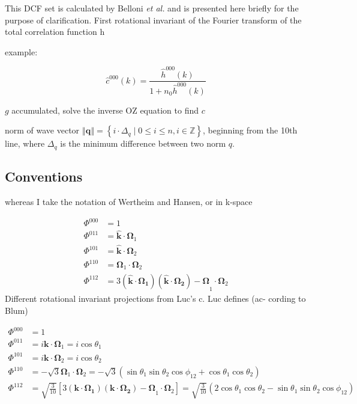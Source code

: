 This DCF set is calculated by Belloni \textit{et al.} \citep{Luc_2012}
and is presented here briefly for the purpose of clarification. First
rotational invariant of the Fourier transform of the total correlation
function h

example:

\[
\hat{c}^{000}(k)=\frac{\hat{h}^{000}(k)}{1+n_{0}\hat{h}^{000}(k)}
\]


$g$ accumulated, solve the inverse OZ equation to find $c$

norm of wave vector $\left\Vert \mathbf{q}\right\Vert =\left\{ i\cdot\Delta_{q}\mid0\leq i\leq n,i\in\mathbb{Z}\right\} $,
beginning from the 10th line, where $\Delta_{q}$ is the minimum difference
between two norm $q$. 


\subsection{Conventions}

whereas I take the notation of Wertheim and Hansen, or in k-space

\begin{align}
\Phi^{000} & =1\nonumber \\
\Phi^{011} & =\hat{\mathbf{k}}\cdot\mathbf{\Omega}_{1}\nonumber \\
\Phi^{101} & =\hat{\mathbf{k}}\cdot\mathbf{\Omega}_{2}\nonumber \\
\Phi^{110} & =\mathbf{\Omega}_{1}\cdot\mathbf{\Omega}_{2}\\
\Phi^{112} & =3\mathbf{(\hat{\mathbf{k}}\cdot\mathbf{\Omega}_{1})(\hat{\mathbf{k}}\cdot\mathbf{\Omega}_{2})-\Omega}_{1}\cdot\mathbf{\Omega}_{2}\nonumber 
\end{align}
Different rotational invariant projections from Luc’s c. Luc defines
(ac- cording to Blum)

\begin{align}
\Phi^{000} & =1\nonumber \\
\Phi^{011} & =i\mathbf{k}\cdot\mathbf{\Omega}_{1}=i\cos\theta_{1}\nonumber \\
\Phi^{101} & =i\mathbf{k}\cdot\mathbf{\Omega}_{2}=i\cos\theta_{2}\nonumber \\
\Phi^{110} & =-\sqrt{3}\mathbf{\Omega}_{1}\cdot\mathbf{\Omega}_{2}=-\sqrt{3}(\sin\theta_{1}\sin\theta_{2}\cos\phi_{12}+\cos\theta_{1}\cos\theta_{2})\\
\Phi^{112} & =\sqrt{\frac{3}{10}}\left[3\mathbf{(\mathbf{k}\cdot\mathbf{\Omega}_{1})(\mathbf{k}\cdot\mathbf{\Omega}_{2})-\Omega}_{1}\cdot\mathbf{\Omega}_{2}\right]=\sqrt{\frac{3}{10}}\left(2\cos\theta_{1}\cos\theta_{2}-\sin\theta_{1}\sin\theta_{2}\cos\phi_{12}\right)\nonumber 
\end{align}



